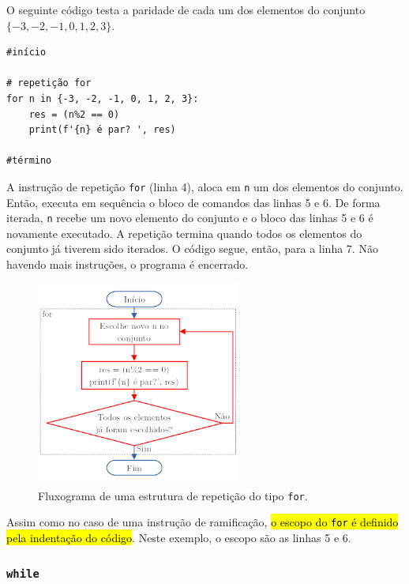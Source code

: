 \begin{ex}\label{cap_progest_sec_est:ex:for}
  O seguinte código testa a paridade de cada um dos elementos do conjunto $\{-3, -2, -1, 0, 1, 2, 3\}$.

\begin{lstlisting}
#início

# repetição for
for n in {-3, -2, -1, 0, 1, 2, 3}:
    res = (n%2 == 0)
    print(f'{n} é par? ', res)
    
#término
\end{lstlisting}

A instrução de repetição \lstinline+for+ (linha 4), aloca em \lstinline+n+ um dos elementos do conjunto. Então, executa em sequência o bloco de comandos das linhas 5 e 6. De forma iterada, \lstinline+n+ recebe um novo elemento do conjunto e o bloco das linhas 5 e 6 é novamente executado. A repetição termina quando todos os elementos do conjunto já tiverem sido iterados. O código segue, então, para a linha 7. Não havendo mais instruções, o programa é encerrado.

\begin{figure}[H]
  \centering
  \includegraphics[width=0.6\textwidth]{./cap_progest/dados/fig_fg_for/fig}
  \caption{Fluxograma de uma estrutura de repetição do tipo \lstinline+for+.}
  \label{cap_progest_sec_est:fig:fg_for}
\end{figure}

Assim como no caso de uma instrução de ramificação, \hl{o escopo do \texttt{for} é definido pela indentação do código}. Neste exemplo, o escopo são as linhas 5 e 6.
\end{ex}

\subsubsection{\lstinline+while+}

